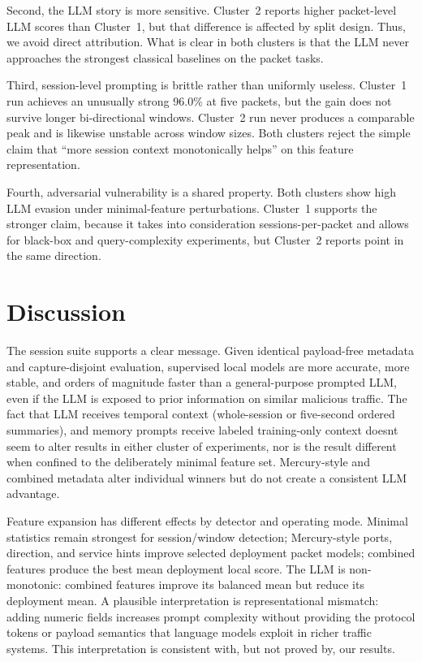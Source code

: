 \documentclass[letterpaper,twocolumn,10pt]{article}
\begin{document}
Second, the LLM story is more sensitive. Cluster~2 reports higher packet-level LLM scores than Cluster~1, but that difference is affected by split design. Thus, we avoid direct attribution. What is clear in both clusters is that the LLM never approaches the strongest classical baselines on the packet tasks.

Third, session-level prompting is brittle rather than uniformly useless. Cluster~1 run achieves an unusually strong 96.0\% at five packets, but the gain does not survive longer bi-directional windows. Cluster~2 run never produces a comparable peak and is likewise unstable across window sizes. Both clusters reject the simple claim that ``more session context monotonically helps'' on this feature representation.

Fourth, adversarial vulnerability is a shared property. Both clusters show high LLM evasion under minimal-feature perturbations. Cluster~1 supports the stronger claim, because it takes into consideration sessions-per-packet and allows for black-box and query-complexity experiments, but Cluster~2 reports point in the same direction.

\section{Discussion}
\label{sec:discussion}

The session suite supports a clear message. Given identical payload-free metadata and capture-disjoint evaluation, supervised local models are more accurate, more stable, and orders of magnitude faster than a general-purpose prompted LLM, even if the LLM is exposed to prior information on similar malicious traffic. The fact that LLM receives temporal context (whole-session or five-second ordered summaries), and memory prompts receive labeled training-only context doesnt seem to alter results in either cluster of experiments, nor is the result different when confined to the deliberately minimal feature set. Mercury-style and combined metadata alter individual winners but do not create a consistent LLM advantage.

Feature expansion has different effects by detector and operating mode. Minimal statistics remain strongest for session/window detection; Mercury-style ports, direction, and service hints improve selected deployment packet models; combined features produce the best mean deployment local score. The LLM is non-monotonic: combined features improve its balanced mean but reduce its deployment mean. A plausible interpretation is representational mismatch: adding numeric fields increases prompt complexity without providing the protocol tokens or payload semantics that language models exploit in richer traffic systems. This interpretation is consistent with, but not proved by, our results.
\end{document}
